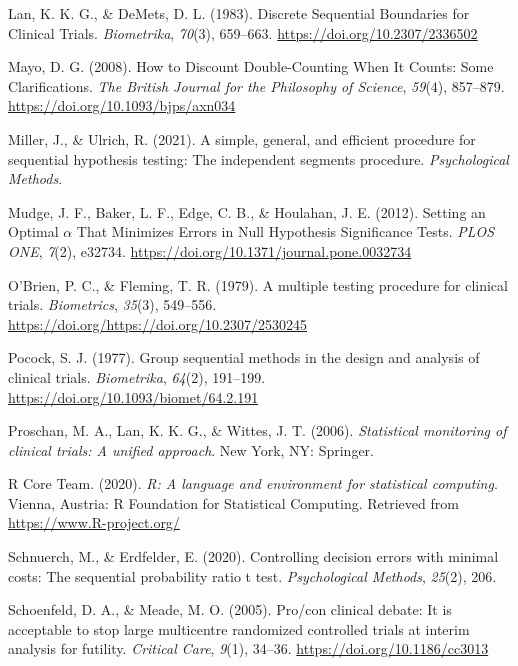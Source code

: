 \documentclass[
  english,
  ,jou, a4paper,floatsintext]{apa6}
\newlength{\cslhangindent}
\newenvironment{cslreferences}%
  {\setlength{\parindent}{0pt}%
  \everypar{\setlength{\hangindent}{\cslhangindent}}\ignorespaces}%
  {\par}
\begin{document}
\begin{cslreferences}
\leavevmode\hypertarget{ref-lan_discrete_1983}{}%
Lan, K. K. G., \& DeMets, D. L. (1983). Discrete Sequential Boundaries for Clinical Trials. \emph{Biometrika}, \emph{70}(3), 659--663. \url{https://doi.org/10.2307/2336502}

\leavevmode\hypertarget{ref-mayo_how_2008}{}%
Mayo, D. G. (2008). How to Discount Double-Counting When It Counts: Some Clarifications. \emph{The British Journal for the Philosophy of Science}, \emph{59}(4), 857--879. \url{https://doi.org/10.1093/bjps/axn034}

\leavevmode\hypertarget{ref-miller_simple_2021}{}%
Miller, J., \& Ulrich, R. (2021). A simple, general, and efficient procedure for sequential hypothesis testing: The independent segments procedure. \emph{Psychological Methods}.

\leavevmode\hypertarget{ref-mudge_setting_2012}{}%
Mudge, J. F., Baker, L. F., Edge, C. B., \& Houlahan, J. E. (2012). Setting an Optimal \(\alpha\) That Minimizes Errors in Null Hypothesis Significance Tests. \emph{PLOS ONE}, \emph{7}(2), e32734. \url{https://doi.org/10.1371/journal.pone.0032734}

\leavevmode\hypertarget{ref-obrien_multiple_1979}{}%
O'Brien, P. C., \& Fleming, T. R. (1979). A multiple testing procedure for clinical trials. \emph{Biometrics}, \emph{35}(3), 549--556. \url{https://doi.org/https://doi.org/10.2307/2530245}

\leavevmode\hypertarget{ref-pocock_group_1977}{}%
Pocock, S. J. (1977). Group sequential methods in the design and analysis of clinical trials. \emph{Biometrika}, \emph{64}(2), 191--199. \url{https://doi.org/10.1093/biomet/64.2.191}

\leavevmode\hypertarget{ref-proschan_statistical_2006}{}%
Proschan, M. A., Lan, K. K. G., \& Wittes, J. T. (2006). \emph{Statistical monitoring of clinical trials: A unified approach}. New York, NY: Springer.

\leavevmode\hypertarget{ref-r_2020}{}%
R Core Team. (2020). \emph{R: A language and environment for statistical computing}. Vienna, Austria: R Foundation for Statistical Computing. Retrieved from \url{https://www.R-project.org/}

\leavevmode\hypertarget{ref-schnuerch_controlling_2020}{}%
Schnuerch, M., \& Erdfelder, E. (2020). Controlling decision errors with minimal costs: The sequential probability ratio t test. \emph{Psychological Methods}, \emph{25}(2), 206.

\leavevmode\hypertarget{ref-schoenfeld_procon_2005}{}%
Schoenfeld, D. A., \& Meade, M. O. (2005). Pro/con clinical debate: It is acceptable to stop large multicentre randomized controlled trials at interim analysis for futility. \emph{Critical Care}, \emph{9}(1), 34--36. \url{https://doi.org/10.1186/cc3013}


\end{cslreferences}
\end{document}
